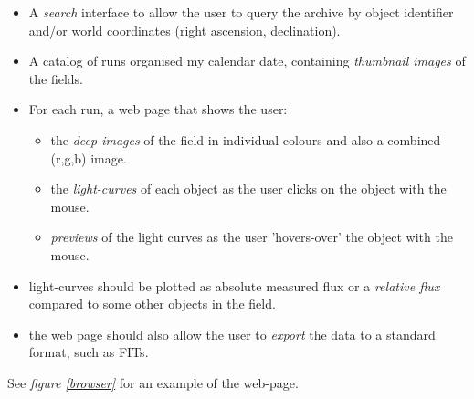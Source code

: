 \documentclass[a4paper,10pt]{article}
\begin{document}
\begin{itemize}
	\item A \emph{search} interface to allow the user to query the archive by object identifier and/or world coordinates (right ascension, declination). 
	\item A catalog of runs organised my calendar date, containing \emph{thumbnail images} of the fields.
	\item For each run, a web page that shows the user:
	\begin{itemize}
		\item the \emph{deep images} of the field in individual colours and also a combined (r,g,b) image.
		\item the \emph{light-curves} of each object as the user clicks on the object with the mouse. 
		\item \emph{previews} of the light curves as the user 'hovers-over' the object with the mouse. 
	\end{itemize}
	\item light-curves should be plotted as absolute measured flux or a \emph{relative flux} compared to some other objects in the field. 
	\item the web page should also allow the user to \emph{export} the data to a standard format, such as FITs.
	
\end{itemize}
See \emph{figure \ref{browser}} for an example of the web-page. 
\end{document}
